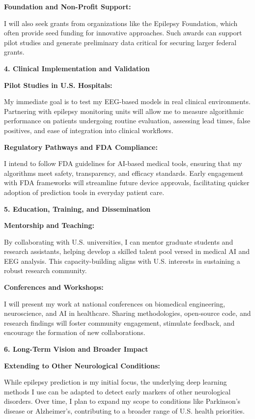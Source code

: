 \documentclass{article}
\begin{document}
{\bf Foundation and Non-Profit Support: }

I will also seek grants from organizations like the Epilepsy Foundation, which often provide seed funding for innovative approaches. Such awards can support pilot studies and generate preliminary data critical for securing larger federal grants.

{\bf 4. Clinical Implementation and Validation }

{\bf Pilot Studies in U.S. Hospitals: }

My immediate goal is to test my EEG-based models in real clinical environments. Partnering with epilepsy monitoring units will allow me to measure algorithmic performance on patients undergoing routine evaluation, assessing lead times, false positives, and ease of integration into clinical workflows.

{\bf Regulatory Pathways and FDA Compliance: }

I intend to follow FDA guidelines for AI-based medical tools, ensuring that my algorithms meet safety, transparency, and efficacy standards. Early engagement with FDA frameworks will streamline future device approvals, facilitating quicker adoption of prediction tools in everyday patient care.

{\bf 5. Education, Training, and Dissemination }

{\bf Mentorship and Teaching: }

By collaborating with U.S. universities, I can mentor graduate students and research assistants, helping develop a skilled talent pool versed in medical AI and EEG analysis. This capacity-building aligns with U.S. interests in sustaining a robust research community.

{\bf Conferences and Workshops: }

I will present my work at national conferences on biomedical engineering, neuroscience, and AI in healthcare. Sharing methodologies, open-source code, and research findings will foster community engagement, stimulate feedback, and encourage the formation of new collaborations.

{\bf 6. Long-Term Vision and Broader Impact } 

{\bf Extending to Other Neurological Conditions: }

While epilepsy prediction is my initial focus, the underlying deep learning methods I use can be adapted to detect early markers of other neurological disorders. Over time, I plan to expand my scope to conditions like Parkinson’s disease or Alzheimer’s, contributing to a broader range of U.S. health priorities.
\end{document}
